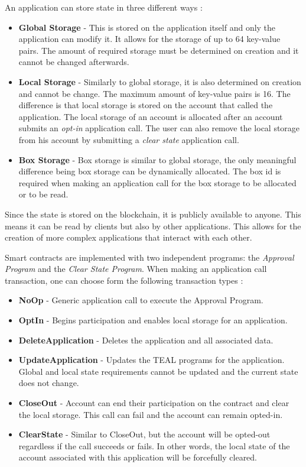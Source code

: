 An application can store state in three different ways \cite{noauthor_contract_nodate}:
\begin{itemize}
    \item \textbf{Global Storage} - This is stored on the application itself and only the application can modify it. It allows for the storage of up to 64 key-value pairs. The amount of required storage must be determined on creation and it cannot be changed afterwards.
    \item \textbf{Local Storage} - Similarly to global storage, it is also determined on creation and cannot be change. The maximum amount of key-value pairs is 16. The difference is that local storage is stored on the account that called the application. The local storage of an account is allocated after an account submits an \textit{opt-in} application call. The user can also remove the local storage from his account by submitting a \textit{clear state} application call.
    \item \textbf{Box Storage} - Box storage is similar to global storage, the only meaningful difference being box storage can be dynamically allocated. The box id is required when making an application call for the box storage to be allocated or to be read.
\end{itemize}
Since the state is stored on the blockchain, it is publicly available to anyone. This means it can be read by clients but also by other applications. This allows for the creation of more complex applications that interact with each other.

Smart contracts are implemented with two independent programs: the \textit{Approval Program} and the \textit{Clear State Program}. When making an application call transaction, one can choose form the following transaction types \cite{noauthor_overview_nodate}:
\begin{itemize}
    \item \textbf{NoOp} - Generic application call to execute the Approval Program.
    \item \textbf{OptIn} - Begins participation and enables local storage for an application.
    \item \textbf{DeleteApplication} - Deletes the application and all associated data.
    \item \textbf{UpdateApplication} - Updates the \ac{TEAL} programs for the application. Global and local state requirements cannot be updated and the current state does not change.
    \item \textbf{CloseOut} - Account can end their participation on the contract and clear the local storage. This call can fail and the account can remain opted-in.
    \item \textbf{ClearState} - Similar to CloseOut, but the account will be opted-out regardless if the call succeeds or fails. In other words, the local state of the account associated with this application will be forcefully cleared.
\end{itemize}

